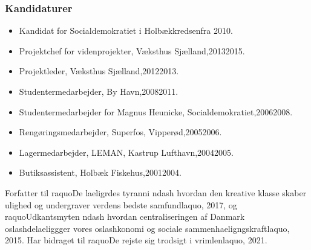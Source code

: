 \documentclass[11pt, a4paper]{awesome-cv}
\begin{document}
\begin{cvletter}
\subsubsection*{Kandidaturer}
\begin{itemize}
\item Kandidat for Socialdemokratiet i Holbækkredsenfra 2010.
\end{itemize}
\begin{itemize}
\item Projektchef for videnprojekter, Væksthus Sjælland,20132015.
\item Projektleder, Væksthus Sjælland,20122013.
\item Studentermedarbejder, By  Havn,20082011.
\item Studentermedarbejder for Magnus Heunicke, Socialdemokratiet,20062008.
\item Rengøringsmedarbejder, Superfos, Vipperød,20052006.
\item Lagermedarbejder, LEMAN, Kastrup Lufthavn,20042005.
\item Butiksassistent, Holbæk Fiskehus,20012004.
\end{itemize}
Forfatter til raquoDe laeligrdes tyranni ndash hvordan den kreative klasse skaber ulighed og undergraver verdens bedste samfundlaquo, 2017, og raquoUdkantsmyten ndash hvordan centraliseringen af Danmark oslashdelaeliggger vores oslashkonomi og sociale sammenhaeligngskraftlaquo, 2015. Har bidraget til raquoDe rejste sig trodsigt i vrimlenlaquo, 2021.

\end{cvletter}
\end{document}
